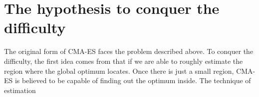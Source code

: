 \section{The hypothesis to conquer the difficulty}

The original form of CMA-ES faces the problem described above.
To conquer the difficulty, the first idea comes from that if we are able to roughly estimate the region where the global optimum locates.
Once there is just a small region, CMA-ES is believed to be capable of finding out the optimum inside.
The technique of estimation 
